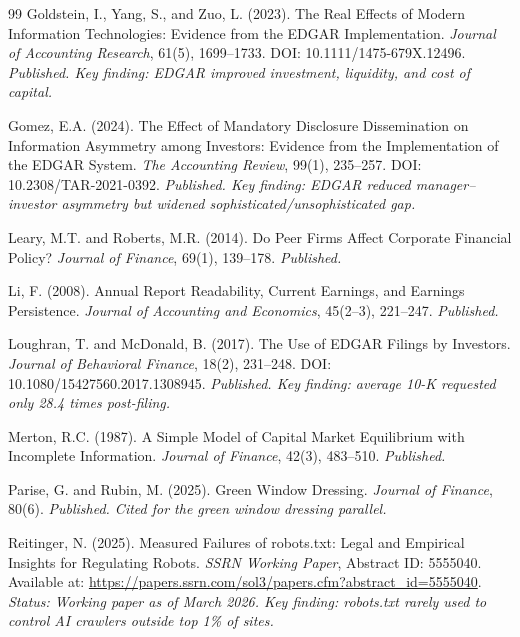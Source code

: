 \documentclass[12pt,a4paper]{article}
\begin{document}
\begin{thebibliography}{99}
Goldstein, I., Yang, S., and Zuo, L. (2023).
\newblock The Real Effects of Modern Information Technologies: Evidence from the EDGAR Implementation.
\newblock \emph{Journal of Accounting Research}, 61(5), 1699--1733.
\newblock DOI: 10.1111/1475-679X.12496.
\newblock \textit{Published. Key finding: EDGAR improved investment, liquidity, and cost of capital.}

Gomez, E.A. (2024).
\newblock The Effect of Mandatory Disclosure Dissemination on Information Asymmetry among Investors: Evidence from the Implementation of the EDGAR System.
\newblock \emph{The Accounting Review}, 99(1), 235--257.
\newblock DOI: 10.2308/TAR-2021-0392.
\newblock \textit{Published. Key finding: EDGAR reduced manager--investor asymmetry but widened sophisticated/unsophisticated gap.}

Leary, M.T. and Roberts, M.R. (2014).
\newblock Do Peer Firms Affect Corporate Financial Policy?
\newblock \emph{Journal of Finance}, 69(1), 139--178.
\newblock \textit{Published.}

Li, F. (2008).
\newblock Annual Report Readability, Current Earnings, and Earnings Persistence.
\newblock \emph{Journal of Accounting and Economics}, 45(2--3), 221--247.
\newblock \textit{Published.}

Loughran, T. and McDonald, B. (2017).
\newblock The Use of EDGAR Filings by Investors.
\newblock \emph{Journal of Behavioral Finance}, 18(2), 231--248.
\newblock DOI: 10.1080/15427560.2017.1308945.
\newblock \textit{Published. Key finding: average 10-K requested only 28.4 times post-filing.}

Merton, R.C. (1987).
\newblock A Simple Model of Capital Market Equilibrium with Incomplete Information.
\newblock \emph{Journal of Finance}, 42(3), 483--510.
\newblock \textit{Published.}

Parise, G. and Rubin, M. (2025).
\newblock Green Window Dressing.
\newblock \emph{Journal of Finance}, 80(6).
\newblock \textit{Published. Cited for the green window dressing parallel.}

Reitinger, N. (2025).
\newblock Measured Failures of robots.txt: Legal and Empirical Insights for Regulating Robots.
\newblock \emph{SSRN Working Paper}, Abstract ID: 5555040.
\newblock Available at: \url{https://papers.ssrn.com/sol3/papers.cfm?abstract_id=5555040}.
\newblock \textit{Status: Working paper as of March 2026. Key finding: robots.txt rarely used to control AI crawlers outside top 1\% of sites.}

\end{thebibliography}
\end{document}
